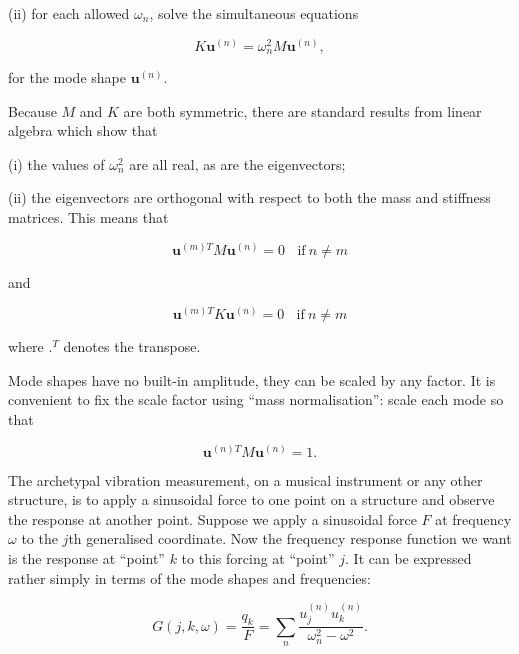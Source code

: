   (ii) for each allowed $\omega_n$, solve the simultaneous equations 

  \begin{equation*}K \mathbf{u}^{(n)}=\omega_n^2 M \mathbf{u}^{(n)}, 
  \tag{9}\end{equation*} 

  \noindent{}for the mode shape $\mathbf{u}^{(n)}$. 

  Because $M$ and $K$ are both symmetric, there are standard results from 
  linear algebra which show that 

  (i) the values of $\omega_n^2$ are all real, as are the eigenvectors; 

  (ii) the eigenvectors are orthogonal with respect to both the mass and 
  stiffness matrices. This means that 

  \begin{equation*} \mathbf{u}^{(m)T} M \mathbf{u}^{(n)} = 0 \mathrm{~~~~if~} n 
  \ne m \tag{10}\end{equation*} 

  \noindent{}and 

  \begin{equation*} \mathbf{u}^{(m)T} K \mathbf{u}^{(n)} = 0 \mathrm{~~~~if~} n 
  \ne m \tag{11}\end{equation*} 

  \noindent{}where $.^T$ denotes the transpose. 

  Mode shapes have no built-in amplitude, they can be scaled by any factor. It 
  is convenient to fix the scale factor using ``mass normalisation'': scale 
  each mode so that 

  \begin{equation*}\mathbf{u}^{(n)T} M \mathbf{u}^{(n)}=1 . 
  \tag{12}\end{equation*} 

  The archetypal vibration measurement, on a musical instrument or any other 
  structure, is to apply a sinusoidal force to one point on a structure and 
  observe the response at another point. Suppose we apply a sinusoidal force 
  $F$ at frequency $\omega$ to the $j$th generalised coordinate. Now the 
  frequency response function we want is the response at ``point'' $k$ to this 
  forcing at ``point'' $j$. It can be expressed rather simply in terms of the 
  mode shapes and frequencies: 

  \begin{equation*}G(j,k,\omega)=\dfrac{q_k}{F}=\sum_n 
  \dfrac{u_j^{(n)}u_k^{(n)}}{\omega_n^2-\omega^2}. \tag{13}\end{equation*} 

